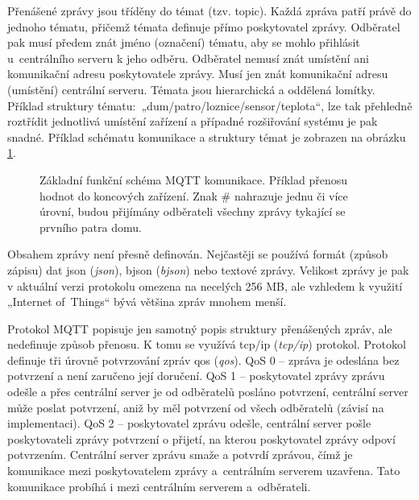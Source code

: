 Přenášené zprávy jsou tříděny do témat (tzv. topic). Každá zpráva patří právě do jednoho tématu, přičemž témata definuje přímo poskytovatel zprávy. Odběratel pak musí předem znát jméno (označení) tématu, aby se mohlo přihlásit u~centrálního serveru k jeho odběru. Odběratel nemusí znát umístění ani komunikační adresu poskytovatele zprávy. Musí jen znát komunikační adresu (umístění) centrální serveru. Témata jsou hierarchická a oddělená lomítky. Příklad struktury tématu:~„dum/patro/loznice/sensor/teplota“, lze tak přehledně roztřídit jednotlivá umístění zařízení a případné rozšiřování systému je pak snadné. Příklad schématu komunikace a struktury témat je zobrazen na obrázku \ref{fig:mqtt-protokol}.
\setnowidow[2]

\begin{figure}[H]
    \centering
    \def\svgwidth{\columnwidth}
    
    \caption[Základní funkční schéma MQTT komunikace.]{Základní funkční schéma MQTT komunikace. Příklad přenosu hodnot do koncových zařízení. Znak \# nahrazuje jednu či více úrovní, budou přijímány odběrateli všechny zprávy tykající se prvního patra domu.}
    \label{fig:mqtt-protokol}
\end{figure}

Obsahem zprávy není přesně definován. Nejčastěji se používá formát (způsob zápisu) dat \acrshort{json} (\textit{\acrlong{json}}), \acrshort{bjson} (\textit{\acrlong{bjson}}) nebo textové zprávy. Velikost zprávy je pak v aktuální verzi protokolu omezena na necelých 256 MB, ale vzhledem k využití „Internet of~Things“ bývá většina zpráv mnohem menší.

Protokol MQTT popisuje jen samotný popis struktury přenášených zpráv, ale nedefinuje způsob přenosu. K tomu se využívá \acrshort{tcp/ip} (\textit{\acrlong{tcp/ip}}) protokol. Protokol definuje tři úrovně potvrzování zpráv \acrshort{qos} (\textit{\acrlong{qos}}). QoS 0 – zpráva je odeslána bez potvrzení a není zaručeno její doručení. QoS 1 – poskytovatel zprávy zprávu odešle a přes centrální server je od odběratelů posláno potvrzení, centrální server může poslat potvrzení, aniž by měl potvrzení od všech odběratelů (závisí na implementaci). QoS 2 – poskytovatel zprávu odešle, centrální server pošle poskytovateli zprávy potvrzení o přijetí, na kterou poskytovatel zprávy odpoví potvrzením. Centrální server zprávu smaže a potvrdí zprávou, čímž je komunikace mezi poskytovatelem zprávy a~centrálním serverem uzavřena. Tato komunikace probíhá i mezi centrálním serverem a~odběrateli.


